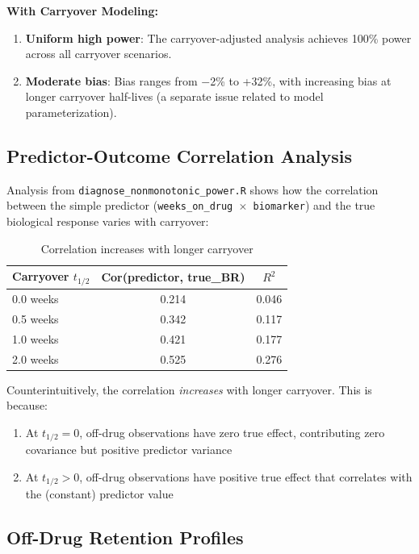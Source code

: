 \documentclass[11pt,a4paper]{article}
\begin{document}
\textbf{With Carryover Modeling:}

\begin{enumerate}
    \item \textbf{Uniform high power}: The carryover-adjusted analysis achieves 100\%
          power across all carryover scenarios.

    \item \textbf{Moderate bias}: Bias ranges from $-$2\% to +32\%, with increasing bias
          at longer carryover half-lives (a separate issue related to model
          parameterization).
\end{enumerate}

\subsection{Predictor-Outcome Correlation Analysis}

Analysis from \texttt{diagnose\_nonmonotonic\_power.R} shows how the correlation between
the simple predictor (\texttt{weeks\_on\_drug $\times$ biomarker}) and the true biological
response varies with carryover:

\begin{table}[H]
\centering
\begin{tabular}{@{}lcc@{}}
\toprule
Carryover $t_{1/2}$ & Cor(predictor, true\_BR) & $R^2$ \\
\midrule
0.0 weeks & 0.214 & 0.046 \\
0.5 weeks & 0.342 & 0.117 \\
1.0 weeks & 0.421 & 0.177 \\
2.0 weeks & 0.525 & 0.276 \\
\bottomrule
\end{tabular}
\caption{Correlation increases with longer carryover}
\end{table}

Counterintuitively, the correlation \textit{increases} with longer carryover. This is
because:
\begin{enumerate}
    \item At $t_{1/2} = 0$, off-drug observations have zero true effect, contributing zero
          covariance but positive predictor variance
    \item At $t_{1/2} > 0$, off-drug observations have positive true effect that correlates
          with the (constant) predictor value
\end{enumerate}

\subsection{Off-Drug Retention Profiles}
\end{document}

